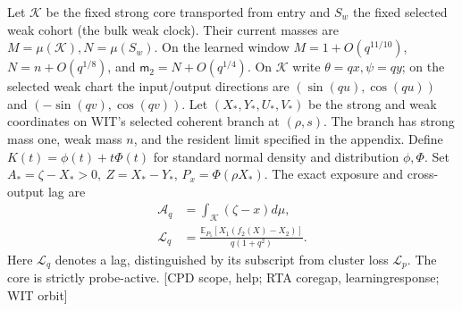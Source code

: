\documentclass[10pt,twocolumn]{article}
\newcommand{\E}{\mathbb E}\newcommand{\dd}{\,d}
\newcommand{\src}[1]{\textnormal{\small [#1]}}
\begin{document}
Let \(\mathcal K\) be the fixed strong core transported from entry and
\(S_w\) the fixed selected weak cohort (the bulk weak clock).
Their current masses are \(M=\mu(\mathcal K), N=\mu(S_w)\).
On the learned window \(M=1+O(q^{11/10})\),
\(N=n+O(q^{1/8})\), and \(\mathsf m_2=N+O(q^{1/4})\).
On \(\mathcal K\) write \(\theta=qx,\psi=qy\);
on the selected weak chart the input/output directions are
\((\sin(qu),\cos(qu))\) and \((-\sin(qv),\cos(qv))\).
Let \((X_*,Y_*,U_*,V_*)\) be the strong and weak coordinates on WIT's
selected coherent branch at \((\rho,s)\). The branch has strong mass
one, weak mass \(n\), and the resident limit specified in the appendix.
Define \(K(t)=\phi(t)+t\Phi(t)\) for standard normal density and
distribution \(\phi,\Phi\). Set \(A_*=\zeta-X_*>0,\ Z=X_*-Y_*\),
\(P_x=\Phi(\rho X_*)\). The exact exposure and cross-output lag are
\begin{align*}
 \mathcal A_q&=\int_{\mathcal K}(\zeta-x)d\mu,\\
 \mathcal L_q&=\frac{\E_{P_1}[X_1(f_2(X)-X_2)]}{q(1+q^2)} .
\end{align*}
Here \(\mathcal L_q\) denotes a lag, distinguished by its subscript
from cluster loss \(\mathcal L_p\). The core is strictly probe-active.
\src{CPD scope, help; RTA coregap, learningresponse; WIT orbit}
\end{document}
